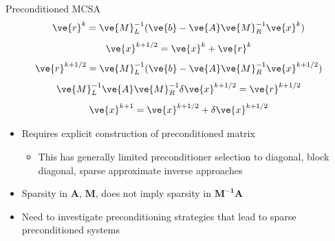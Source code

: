 \documentclass{beamer}
\begin{document}
\begin{frame}{Preconditioned MCSA}
\vspace*{-0.2in}
  {
    \small
    \[
    \ve{r}^{k} = \ve{M}_L^{-1}(\ve{b}-\ve{A}\ve{M}_R^{-1}\ve{x}^{k})
    \]
    \[
    \ve{x}^{k+1/2} = \ve{x}^k + \ve{r}^k
    \]
    \[
    \ve{r}^{k+1/2} = \ve{M}_L^{-1}(\ve{b}-\ve{A}\ve{M}_R^{-1}\ve{x}^{k+1/2})
    \]
    \[
    \ve{M}_L^{-1}\ve{A}\ve{M}_R^{-1}\delta\ve{x}^{k+1/2} = \ve{r}^{k+1/2}
    \]
    \[
    \ve{x}^{k+1} = \ve{x}^{k+1/2} + \delta \ve{x}^{k+1/2}
    \]
  }
  \vspace*{-0.1in}
  \begin{itemize}
    \item Requires explicit construction of preconditioned matrix
      \begin{itemize}
        \item This has generally limited preconditioner selection to diagonal,
          block diagonal, sparse approximate inverse approaches
      \end{itemize}
    \vfill
    \item Sparsity in $\mathbf{A}$, $\mathbf{M}$, does not imply sparsity
      in $\mathbf{M^{-1}A}$
    \vfill
    \item Need to investigate preconditioning strategies that lead to sparse
      preconditioned systems
  \end{itemize}
\end{frame}

\end{document}
